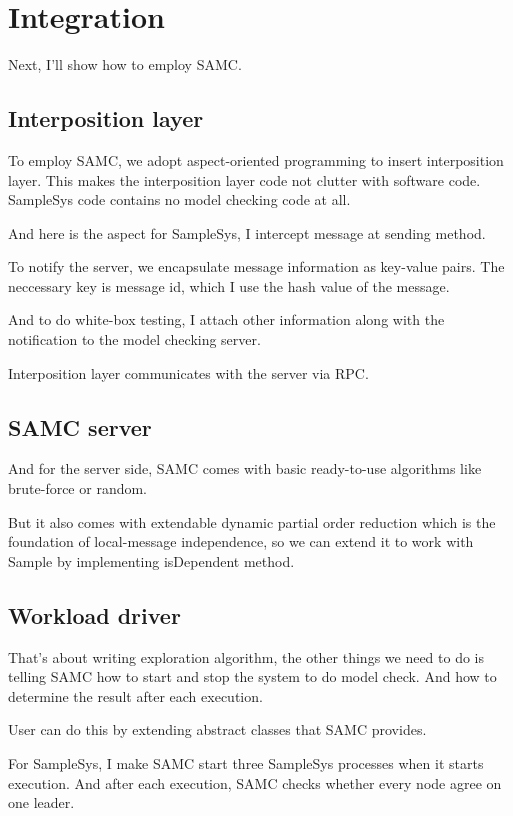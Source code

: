 \section{Integration}

Next, I'll show how to employ SAMC.

\subsection{Interposition layer}

To employ SAMC, we adopt aspect-oriented programming to insert interposition
layer. This makes the interposition layer code not clutter with software code.
SampleSys code contains no model checking code at all.

And here is the aspect for SampleSys, I intercept message at sending method.

To notify the server, we encapsulate message information as key-value pairs. The
neccessary key is message id, which I use the hash value of the message.

And to do white-box testing, I attach other information along with the
notification to the model checking server. 

Interposition layer communicates with the server via RPC.


\subsection{SAMC server}

And for the server side, SAMC comes with basic ready-to-use algorithms like
brute-force or random.

But it also comes with extendable dynamic partial order reduction which is the
foundation of local-message independence, so we can extend it to work with
Sample by implementing isDependent method.

\subsection{Workload driver}
That's about writing exploration algorithm, the other things we need to do is
telling SAMC how to start and stop the system to do model check. And how to
determine the result after each execution.

User can do this by extending abstract classes that SAMC provides. 

For SampleSys, I make SAMC start three SampleSys processes when it starts
execution. And after each execution, SAMC checks whether every node agree on
one leader.

